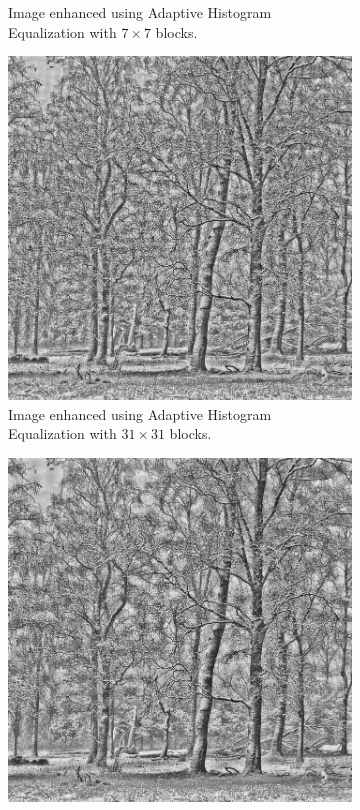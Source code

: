\documentclass[a4paper, landscape]{article}
\begin{document}
\begin{figure}
\begin{subfigure}{0.32\linewidth}
        \caption{Image enhanced using Adaptive Histogram Equalization with $7\times 7$ blocks.}
    \end{subfigure}
    \begin{subfigure}{0.32\linewidth}
        \centering
        \includegraphics[width=0.9\linewidth]{medium_enhanced_LC2.png}
        \caption{Image enhanced using Adaptive Histogram Equalization with $31\times 31$ blocks.}
    \end{subfigure}
    \centering
    \begin{subfigure}{0.32\linewidth}
        \centering
        \includegraphics[width=0.9\linewidth]{big_enhanced_LC2.png}

\end{subfigure}
\end{figure}
\end{document}

